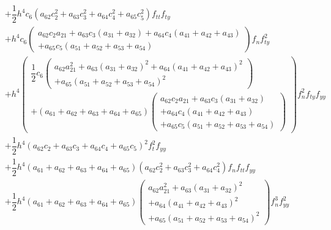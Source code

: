 \documentclass[a4paper,oneside]{book}
\numberwithin{equation}{chapter}
\begin{document}
\begin{align}
 &+ \dfrac{1}{2}{h^4}{c_6}\left( {{a_{62}}c_2^2 + {a_{63}}c_3^2 + {a_{64}}c_4^2 + {a_{65}}c_5^2} \right){f_{tt}}{f_{ty}}\\
 &+ {h^4}{c_6}\left( \begin{array}{l}
{a_{62}}{c_2}{a_{21}} + {a_{63}}{c_3}\left( {{a_{31}} + {a_{32}}} \right) + {a_{64}}{c_4}\left( {{a_{41}} + {a_{42}} + {a_{43}}} \right)\\
 + {a_{65}}{c_5}\left( {{a_{51}} + {a_{52}} + {a_{53}} + {a_{54}}} \right)
\end{array} \right){f_n}f_{ty}^2\\
& + {h^4}\left( \begin{array}{l}
\dfrac{1}{2}{c_6}\left( \begin{array}{l}
{a_{62}}a_{21}^2 + {a_{63}}{\left( {{a_{31}} + {a_{32}}} \right)^2} + {a_{64}}{\left( {{a_{41}} + {a_{42}} + {a_{43}}} \right)^2}\\
 + {a_{65}}{\left( {{a_{51}} + {a_{52}} + {a_{53}} + {a_{54}}} \right)^2}
\end{array} \right)\\
 + \left( {{a_{61}} + {a_{62}} + {a_{63}} + {a_{64}} + {a_{65}}} \right)\left( \begin{array}{l}
{a_{62}}{c_2}{a_{21}} + {a_{63}}{c_3}\left( {{a_{31}} + {a_{32}}} \right)\\
 + {a_{64}}{c_4}\left( {{a_{41}} + {a_{42}} + {a_{43}}} \right)\\
 + {a_{65}}{c_5}\left( {{a_{51}} + {a_{52}} + {a_{53}} + {a_{54}}} \right)
\end{array} \right)
\end{array} \right)f_n^2{f_{ty}}{f_{yy}}\\
 &+ \dfrac{1}{2}{h^4}{\left( {{a_{62}}{c_2} + {a_{63}}{c_3} + {a_{64}}{c_4} + {a_{65}}{c_5}} \right)^2}f_t^2{f_{yy}}\\
& + \dfrac{1}{2}{h^4}\left( {{a_{61}} + {a_{62}} + {a_{63}} + {a_{64}} + {a_{65}}} \right)\left( {{a_{62}}c_2^2 + {a_{63}}c_3^2 + {a_{64}}c_4^2} \right){f_n}{f_{tt}}{f_{yy}}\\
 &+ \dfrac{1}{2}{h^4}\left( {{a_{61}} + {a_{62}} + {a_{63}} + {a_{64}} + {a_{65}}} \right)\left( \begin{array}{l}
{a_{62}}a_{21}^2 + {a_{63}}{\left( {{a_{31}} + {a_{32}}} \right)^2}\\
 + {a_{64}}{\left( {{a_{41}} + {a_{42}} + {a_{43}}} \right)^2}\\
 + {a_{65}}{\left( {{a_{51}} + {a_{52}} + {a_{53}} + {a_{54}}} \right)^2}
\end{array} \right)f_n^3f_{yy}^2\\

\end{align}
\end{document}
